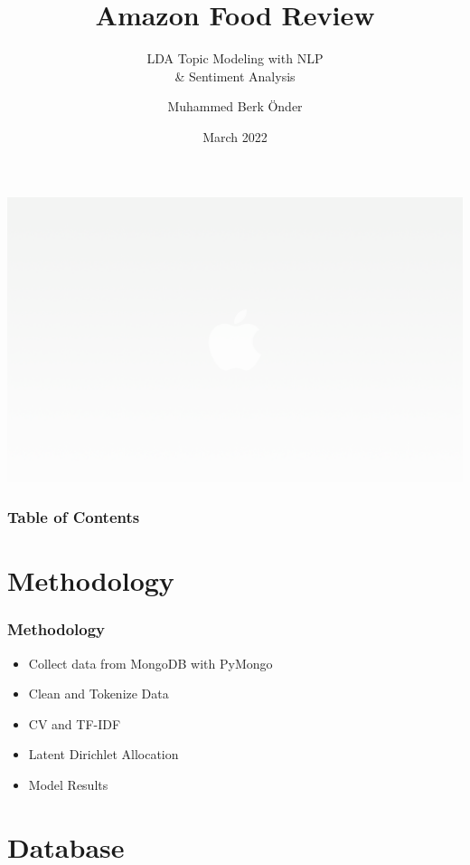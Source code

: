 \documentclass{beamer}
\title[] %
{Amazon Food Review}
\subtitle{LDA Topic Modeling with NLP\\
\& Sentiment Analysis
}
\author[] %
{Muhammed Berk Önder}
\institute[] %
{
  Istanbul Data Science Academy
}
\date[] %
{March 2022}
\begin{document}
\frame{\titlepage}

{
    \includegraphics[width=\paperwidth, height=\paperheight]{img/white.jpg}
}

\begin{frame}
\frametitle{Table of Contents}
\tableofcontents
\end{frame}

\section{Methodology}

\begin{frame}
\frametitle{Methodology}
\begin{itemize}
    \item Collect data from MongoDB with PyMongo
    \item Clean and Tokenize Data
    \item CV and TF-IDF
    \item Latent Dirichlet Allocation
    \item Model Results
\end{itemize}
\end{frame}


\section{Database}
\end{document}
